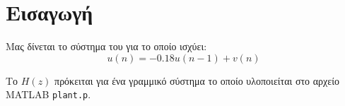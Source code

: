 \section{Εισαγωγή}
Μας δίνεται το σύστημα του 
για το οποίο ισχύει:
\begin{equation}
u(n) = -0.18 u(n-1) + v(n)\label{eq:u}
\end{equation}

Το $H(z)$ πρόκειται για ένα γραμμικό σύστημα το οποίο υλοποιείται στο αρχείο MATLAB \texttt{plant.p}.

